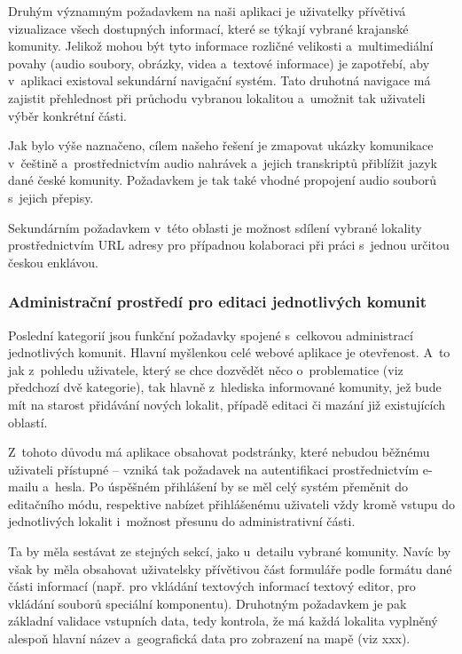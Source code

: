 Druhým významným požadavkem na naši aplikaci je uživatelky přívětivá vizualizace všech dostupných informací, které se týkají vybrané krajanské komunity. Jelikož mohou být tyto informace rozličné velikosti a~multimediální povahy (audio soubory, obrázky, videa a~textové informace) je zapotřebí, aby v~aplikaci existoval sekundární navigační systém. Tato druhotná navigace má zajistit přehlednost při průchodu vybranou lokalitou a~umožnit tak uživateli výběr konkrétní části.

Jak bylo výše naznačeno, cílem našeho řešení je zmapovat ukázky komunikace v~češtině a~prostřednictvím audio nahrávek a~jejich transkriptů přiblížit jazyk dané české komunity. Požadavkem je tak také vhodné propojení audio souborů s~jejich přepisy.

Sekundárním požadavkem v~této oblasti je možnost sdílení vybrané lokality prostřednictvím URL adresy pro případnou kolaboraci při práci s~jednou určitou českou enklávou.

\hypertarget{administraux10dnuxed-prostux159eduxed-pro-editaci-jednotlivuxfdch-komunit}{%
\subsubsection{Administrační prostředí pro editaci jednotlivých komunit}\label{administraux10dnuxed-prostux159eduxed-pro-editaci-jednotlivuxfdch-komunit}}

Poslední kategorií jsou funkční požadavky spojené s~celkovou administrací jednotlivých komunit. Hlavní myšlenkou celé webové aplikace je otevřenost. A~to jak z~pohledu uživatele, který se chce dozvědět něco o~problematice (viz předchozí dvě kategorie), tak hlavně z~hlediska informované komunity, jež bude mít na starost přidávání nových lokalit, případě editaci či mazání již existujících oblastí.

Z~tohoto důvodu má aplikace obsahovat podstránky, které nebudou běžnému uživateli přístupné -- vzniká tak požadavek na autentifikaci prostřednictvím e-mailu a~hesla. Po úspěšném přihlášení by se měl celý systém přeměnit do editačního módu, respektive nabízet přihlášenému uživateli vždy kromě vstupu do jednotlivých lokalit i~možnost přesunu do administrativní části.

Ta by měla sestávat ze stejných sekcí, jako u~detailu vybrané komunity. Navíc by však by měla obsahovat uživatelsky přívětivou část formuláře podle formátu dané části informací (např. pro vkládání textových informací textový editor, pro vkládání souborů speciální komponentu). Druhotným požadavkem je pak základní validace vstupních data, tedy kontrola, že má každá lokalita vyplněný alespoň hlavní název a~geografická data pro zobrazení na mapě (viz xxx).

